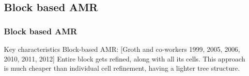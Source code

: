 \documentclass{beamer}
\begin{document}

\subsection{Block based AMR}
\begin{frame}%
\frametitle{Block based AMR}
\tiny
\begin{minipage}[t][1\textheight]{1\textwidth}
\vspace{-15pt}
\begin{exampleblock}{Key characteristics}
Block-based AMR: [Groth and co-workers 1999, 2005, 2006, 2010, 2011, 2012] \newline
Entire block gets refined, along with all its cells. This approach is much cheaper than individual cell refinement, having a lighter tree structure.
\vspace{-20pt}
\begin{figure}
\label{fig:cubeAMRbased}
\centering
{}

\end{figure}
\end{exampleblock}
\end{minipage}
\end{frame}
\end{document}
